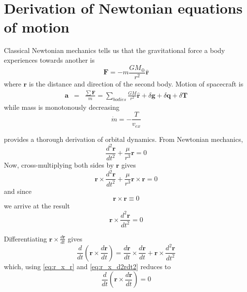 \chapter{Derivation of Newtonian equations of motion}
\label{cha:Derivation-of-Newtonian}

Classical Newtonian mechanics tells us that the gravitational force a body experiences towards another is 
\begin{equation}
\mathbf{F}=-m\frac{GM_{\oplus}}{r^{2}}\mathbf{\hat{r}}\label{eq:F}
\end{equation}
where $\mathbf{r}$ is the distance and direction of the second body. Motion of spacecraft is
\begin{eqnarray}
\mathbf{a} & = & \frac{\sum\mathbf{F}}{m}=\sum_{bodies}\frac{GM}{r^{2}}\mathbf{\hat{r}}+\delta\mathbf{g}+\delta\mathbf{q}+\delta\mathbf{T}
\label{eq:grav_acceleration}
\end{eqnarray}
while mass is monotonously decreasing
\begin{equation}
\dot{m}=-\frac{T}{v_{ex}}\label{eq:m_dot}
\end{equation}

\citet{Kaplan1976} provides a thorough derivation of orbital dynamics. From Newtonian mechanics,
\begin{equation}
\frac{d^{2}\mathbf{r}}{dt^{2}}+\frac{\mu}{r^{3}}\mathbf{r}=0\label{eq:Newton}
\end{equation}
Now, cross-multiplying both sides by $\mathbf{r}$ gives
\begin{equation}
\mathbf{r}\times\frac{d^{2}\mathbf{r}}{dt^{2}}+\frac{\mu}{r^{3}}\mathbf{r}\times\mathbf{r}=0\label{eq:temp}
\end{equation}
and since 
\begin{equation}
\mathbf{r}\times\mathbf{r}\equiv0\label{eq:r_x_r}
\end{equation}
we arrive at the result
\begin{equation}
\mathbf{r}\times\frac{d^{2}\mathbf{r}}{dt^{2}}=0\label{eq:r_x_d2rdt2}
\end{equation}

Differentiating $\mathbf{r}\times\frac{d\mathbf{r}}{dt}$ gives
\begin{equation}
\frac{d}{dt}\left(\mathbf{r}\times\frac{d\mathbf{r}}{dt}\right)=\frac{d\mathbf{r}}{dt}\times\frac{d\mathbf{r}}{dt}+\mathbf{r}\times\frac{d^{2}\mathbf{r}}{dt^{2}}\label{eq:temp2}
\end{equation}
which, using \eqref{eq:r_x_r} and \eqref{eq:r_x_d2rdt2} reduces to 
\begin{equation}
\frac{d}{dt}\left(\mathbf{r}\times\frac{d\mathbf{r}}{dt}\right)=0\label{eq:ddt_r_x_drdt}
\end{equation}

